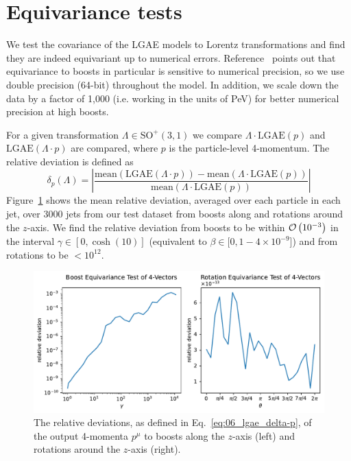 \section{Equivariance tests}
\label{app:06_lgae_equivariancetests}

We test the covariance of the LGAE models to Lorentz transformations and find they are indeed equivariant up to numerical errors.
Reference~\cite{bogatskiy2020lorentz} points out that equivariance to boosts in particular is sensitive to numerical precision, so we use double precision (64-bit) throughout the model. 
In addition, we scale down the data by a factor of 1,000 (i.e. working in the units of PeV) for better numerical precision at high boosts.

For a given transformation $\Lambda \in \mathrm{SO}^+(3,1)$ we compare $\Lambda \cdot \mathrm{LGAE}(p)$ and $ \mathrm{LGAE}(\Lambda \cdot p)$ are compared, where $p$ is the particle-level 4-momentum. 
The relative deviation is defined as
\begin{equation} \label{eq:06_lgae_delta-p}
    \delta_p(\Lambda) = \left|\frac{
        \mathrm{mean}(\mathrm{LGAE}(\Lambda \cdot p)) -
        \mathrm{mean}(\Lambda \cdot \mathrm{LGAE}(p))
    }{\mathrm{mean}(\Lambda \cdot \mathrm{LGAE}(p))}\right|
\end{equation}
Figure~\ref{fig:06_lgae_equivariance} shows the mean relative deviation, averaged over each particle in each jet, over $3000$ jets from our test dataset from boosts along and rotations around the $z$-axis.
We find the relative deviation from boosts to be within $\mathcal{O} \left( 10^{-3} \right)$ in the interval $\gamma \in [0, \cosh(10)]$ (equivalent to $\beta \in [0, 1 - 4\times10^{-9}$]) and from rotations to be $<10^{12}$. 

\begin{figure}[ht]
    \centering
    \includegraphics[width=\linewidth]{figures/06-ML4Jets/lgae/covariance/equivariance-p4.pdf}
    \caption{The relative deviations, as defined in Eq.~\ref{eq:06_lgae_delta-p}, of the output 4-momenta $p^\mu$ to boosts along the $z$-axis (left) and rotations around the $z$-axis (right).}
    \label{fig:06_lgae_equivariance}
\end{figure}